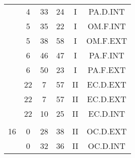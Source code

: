 \documentclass[12pt, a4paper]{article}
\begin{document}
\begin{multicols}{3}
{\begin{tabular}{c c c c c c}
	 	 	 	 & 4 & 33 & 24 & I & PA.D.INT\\%
	 	 	 	 & 5 & 35 & 22 & I & OM.F.INT\\%
	 	 	 	 & 5 & 38 & 58 & I & OM.F.EXT\\%
	 	 	 	 & 6 & 46 & 47 & I & PA.F.INT\\%
	 	 	 	 & 6 & 50 & 23 & I & PA.F.EXT\\%
	 	 	 	 & 22 & 7 & 57 & II & EC.D.EXT\\%
	 	 	 	 & 22 & 7 & 57 & II & EC.D.EXT\\%
	 	 	 	 & 22 & 10 & 25 & II & EC.D.INT\\%
	 	 	 	 & & & & & \\%
	 	 	 	16 & 0 & 28 & 38 & II & OC.D.EXT\\%
	 	 	 	 & 0 & 32 & 36 & II & OC.D.INT\\%
	 	 \end{tabular}
 	}
\end{multicols}
\end{document}
